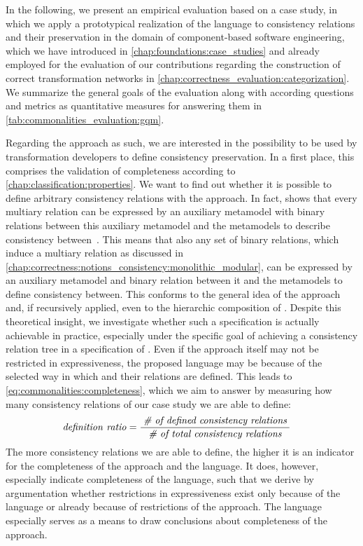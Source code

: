In the following, we present an empirical evaluation based on a case study, in which we apply a prototypical realization of the \commonalities language to consistency relations and their preservation in the domain of component-based software engineering, which we have introduced in \autoref{chap:foundations:case_studies} and already employed for the evaluation of our contributions regarding the construction of correct transformation networks in \autoref{chap:correctness_evaluation:categorization}.
We summarize the general goals of the evaluation along with according questions and metrics as quantitative measures for answering them in \autoref{tab:commonalities_evaluation:gqm}.

Regarding the \commonalities approach as such, we are interested in the possibility to be used by transformation developers to define consistency preservation.
In a first place, this comprises the validation of completeness according to \autoref{chap:classification:properties}.
We want to find out whether it is possible to define arbitrary consistency relations with the \commonalities approach. 
In fact, \citeauthor{stevens2020BidirectionalTransformationLarge-SoSym} shows that every multiary relation can be expressed by an auxiliary metamodel with binary relations between this auxiliary metamodel and the metamodels to describe consistency between~\cite{stevens2020BidirectionalTransformationLarge-SoSym}.
This means that also any set of binary relations, which induce a multiary relation as discussed in \autoref{chap:correctness:notions_consistency:monolithic_modular}, can be expressed by an auxiliary metamodel and binary relation between it and the metamodels to define consistency between.
This conforms to the general idea of the \commonalities approach and, if recursively applied, even to the hierarchic composition of \commonalities.
Despite this theoretical insight, we investigate whether such a specification is actually achievable in practice, especially under the specific goal of achieving a consistency relation tree in a specification of \commonalities.
Even if the \commonalities approach itself may not be restricted in expressiveness, the proposed \commonalities language may be because of the selected way in which \commonalities and their relations are defined.
This leads to \autoref{eq:commonalities:completeness}, which we aim to answer by measuring how many consistency relations of our case study we are able to define:
\begin{align*}
    &
    \mathit{definition\ ratio} = \frac{\; \textit{\# of defined consistency relations} \;}{\; \textit{\# of total consistency relations} \;}
\end{align*}
The more consistency relations we are able to define, the higher it is an indicator for the completeness of the approach and the language. 
It does, however, especially indicate completeness of the \commonalities language, such that we derive by argumentation whether restrictions in expressiveness exist only because of the language or already because of restrictions of the \commonalities approach.
The language especially serves as a means to draw conclusions about completeness of the approach.

